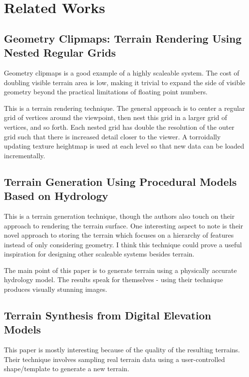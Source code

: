 
\chapter{Related Works}

\section{Geometry Clipmaps: Terrain Rendering Using Nested Regular Grids}

Geometry clipmaps is a good example of a highly scaleable system. The cost of doubling visible terrain area is low, making it trivial to expand the side of visible geometry beyond the practical limitations of floating point numbers. \cite{geometry_clipmaps}

This is a terrain rendering technique.
The general approach is to center a regular grid of vertices around the viewpoint, then nest this grid in a larger grid of vertices, and so forth.
Each nested grid has double the resolution of the outer grid such that there is increased detail closer to the viewer.
A torroidally updating texture heightmap is used at each level so that new data can be loaded incrementally.


\section{Terrain Generation Using Procedural Models Based on Hydrology}

This is a terrain generation technique, though the authors also touch on their approach to rendering the terrain surface.
One interesting aspect to note is their novel approach to storing the terrain which focuses on a hierarchy of features instead of only considering geometry.
I think this technique could prove a useful inspiration for designing other scaleable systems besides terrain.

The main point of this paper is to generate terrain using a physically accurate hydrology model.
The results speak for themselves - using their technique produces visually stunning images.


\section{Terrain Synthesis from Digital Elevation Models}

This paper is mostly interesting because of the quality of the resulting terrains.
Their technique involves sampling real terrain data using a user-controlled shape/template to generate a new terrain.

